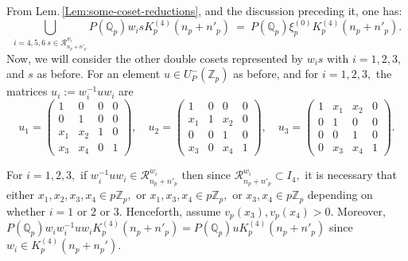 \documentclass[11pt]{amsart}
\newcommand{\mirp}[1]{K_p^{(4)}(#1)}
\begin{document}
From Lem.\,\ref{Lem:some-coset-reductions}, and the discussion preceding it, one has:
\[ 
\bigcup_{i=4,5,6 \ s \in \mathcal{R}_{n_p + n'_p}^{w_i}}
P(\mathbb{Q}_p) w_i s \mirp{n_p + n'_p} \ = \ 
P(\mathbb{Q}_p) \xi_p^{(0)} \mirp{n_p + n'_p}.
\]
Now, we will consider the other double cosets represented by $w_i s$ with $i = 1, 2, 3,$ and $s$ as before.  
For an element $ u  \in U_P^{-}(\mathbb{Z}_p)$ as before, and for $i=1,2,3,$ the matrices $u_i := w_i^{-1}uw_i$ are
\begin{equation*}
u_1 =
	\left(\begin{smallmatrix}
		1 & 0 & 0 & 0 \\
		0 & 1 & 0 & 0 \\
		x_1 & x_2 & 1 & 0 \\
		x_3 & x_4 & 0 & 1
	\end{smallmatrix}\right), \quad 
u_2 = 
	\left(\begin{smallmatrix}
		1 & 0 & 0 & 0 \\
		x_1 & 1 & x_2 & 0 \\
		0 & 0 & 1 & 0 \\
		x_3 & 0 & x_4 & 1
	\end{smallmatrix}\right), \quad 
u_3 = 
	\left(\begin{smallmatrix}
		1 & x_1 & x_2 & 0 \\
		0 & 1 & 0 & 0 \\
		0 & 0 & 1 & 0 \\
		0 & x_3 & x_4 & 1
	\end{smallmatrix}\right).
\end{equation*}

For $i = 1, 2, 3,$ if $w_i^{-1}uw_i \in \mathcal{R}_{n_p + n'_p}^{w_i}$ then since $\mathcal{R}_{n_p + n'_p}^{w_i} \subset I_4,$ it  is necessary 
that either $x_1,x_2,x_3,x_4 \in p\mathbb{Z}_p,$ or $x_1,x_3,x_4 \in p\mathbb{Z}_p,$ or $x_3, x_4 \in p \mathbb{Z}_p$ depending on whether $i=1$ or $2$ or $3$. 
Henceforth, assume $v_p(x_3), v_p(x_4) > 0.$ Moreover, $P(\mathbb{Q}_p) w_i w_i^{-1}uw_i \mirp{n_p + n'_p} = P(\mathbb{Q}_p) u \mirp{n_p + n'_p}$ 
since $w_i \in \mirp{n_p+n_p'}.$ 
\end{document}
